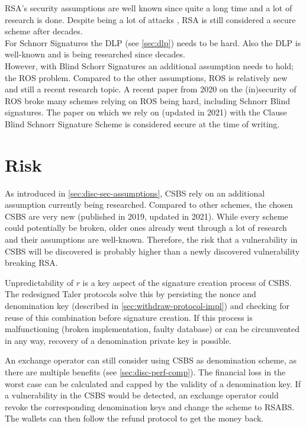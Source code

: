 RSA's security assumptions are well known since quite a long time and a lot of research is done.
Despite being a lot of attacks \cite{ganapati:rsactftool} \cite{perez:stoprsa}, RSA is still considered a secure scheme after decades.\\
For Schnorr Signatures the \acl{DLP} (see \autoref{sec:dlp}) needs to be hard.
Also the \ac{DLP} is well-known and is being researched since decades.\\
However, with Blind Schorr Signatures an additional assumption needs to hold; the \ac{ROS} problem.
Compared to the other assumptions, \ac{ROS} is relatively new and still a recent research topic.
A recent paper from 2020 on the (in)security of ROS \cite{cryptoeprint:2020:945} broke many schemes relying on ROS being hard, including Schnorr Blind signatures.
The paper on which we rely on (updated in 2021) with the Clause Blind Schnorr Signature Scheme \cite{cryptoeprint:2019:877} is considered secure at the time of writing.\\

\section{Risk}
\label{sec:disc-risk}
As introduced in \autoref{sec:disc-sec-assumptions}, \gls{CSBS} rely on an additional assumption currently being researched.
Compared to other schemes, the chosen \gls{CSBS} are very new (published in 2019, updated in 2021).
While every scheme could potentially be broken, older ones already went through a lot of research and their assumptions are well-known.
Therefore, the risk that a vulnerability in \gls{CSBS} will be discovered is probably higher than a newly discovered vulnerability breaking RSA.

Unpredictability of $ r $ is a key aspect of the signature creation process of \gls{CSBS}.
The redesigned Taler protocols solve this by persisting the nonce and denomination key (described in \autoref{sec:withdraw-protocol-impl}) and checking for reuse of this combination before signature creation.
If this process is malfunctioning (broken implementation, faulty database) or can be circumvented in any way, recovery of a denomination private key is possible.

An exchange operator can still consider using \gls{CSBS} as denomination scheme, as there are multiple benefits (see \autoref{sec:disc-perf-comp}).
The financial loss in the worst case can be calculated and capped by the validity of a denomination key.
If a vulnerability in the \gls{CSBS} would be detected, an exchange operator could revoke the corresponding denomination keys and change the scheme to \gls{RSABS}.
The wallets can then follow the refund protocol to get the money back.

